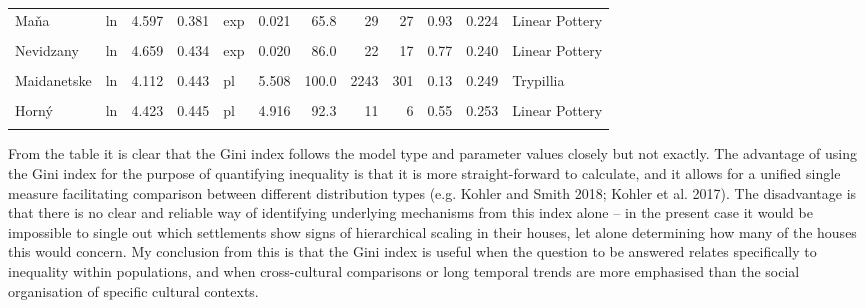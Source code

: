 \documentclass[
  12pt,
  a4paper, twoside]{book}
\begin{document}
\begin{landscape}
\begin{table}
\begin{tabular}[t]{llrrlrrrrrrl}
\addlinespace
Maňa & ln & 4.597 & 0.381 & exp & 0.021 & 65.8 & 29 & 27 & 0.93 & 0.224 & Linear Pottery\\
\cellcolor{gray!6}{Čierne} & \cellcolor{gray!6}{ln} & \cellcolor{gray!6}{4.703} & \cellcolor{gray!6}{0.376} & \cellcolor{gray!6}{exp} & \cellcolor{gray!6}{0.021} & \cellcolor{gray!6}{89.2} & \cellcolor{gray!6}{49} & \cellcolor{gray!6}{36} & \cellcolor{gray!6}{0.73} & \cellcolor{gray!6}{0.211} & \cellcolor{gray!6}{Linear Pottery}\\
Nevidzany & ln & 4.659 & 0.434 & exp & 0.020 & 86.0 & 22 & 17 & 0.77 & 0.240 & Linear Pottery\\
\cellcolor{gray!6}{Moshuriv} & \cellcolor{gray!6}{ln} & \cellcolor{gray!6}{4.211} & \cellcolor{gray!6}{0.395} & \cellcolor{gray!6}{pl} & \cellcolor{gray!6}{6.306} & \cellcolor{gray!6}{85.3} & \cellcolor{gray!6}{84} & \cellcolor{gray!6}{29} & \cellcolor{gray!6}{0.35} & \cellcolor{gray!6}{0.219} & \cellcolor{gray!6}{Trypillia}\\
Maidanetske & ln & 4.112 & 0.443 & pl & 5.508 & 100.0 & 2243 & 301 & 0.13 & 0.249 & Trypillia\\
\addlinespace
\cellcolor{gray!6}{Vráble 'VL'} & \cellcolor{gray!6}{ln} & \cellcolor{gray!6}{4.198} & \cellcolor{gray!6}{0.389} & \cellcolor{gray!6}{pl} & \cellcolor{gray!6}{5.235} & \cellcolor{gray!6}{83.6} & \cellcolor{gray!6}{313} & \cellcolor{gray!6}{91} & \cellcolor{gray!6}{0.29} & \cellcolor{gray!6}{0.221} & \cellcolor{gray!6}{Linear Pottery}\\
Horný & ln & 4.423 & 0.445 & pl & 4.916 & 92.3 & 11 & 6 & 0.55 & 0.253 & Linear Pottery\\
\cellcolor{gray!6}{Nebelivka} & \cellcolor{gray!6}{ln} & \cellcolor{gray!6}{4.045} & \cellcolor{gray!6}{0.432} & \cellcolor{gray!6}{pl} & \cellcolor{gray!6}{4.764} & \cellcolor{gray!6}{62.6} & \cellcolor{gray!6}{1435} & \cellcolor{gray!6}{629} & \cellcolor{gray!6}{0.44} & \cellcolor{gray!6}{0.239} & \cellcolor{gray!6}{Trypillia}\\
\bottomrule
\end{tabular}
\end{table}
\end{landscape}

From the table it is clear that the Gini index follows the model type and parameter values closely but not exactly. The advantage of using the Gini index for the purpose of quantifying inequality is that it is more straight-forward to calculate, and it allows for a unified single measure facilitating comparison between different distribution types (e.g. Kohler and Smith 2018; Kohler et al. 2017). The disadvantage is that there is no clear and reliable way of identifying underlying mechanisms from this index alone -- in the present case it would be impossible to single out which settlements show signs of hierarchical scaling in their houses, let alone determining how many of the houses this would concern. My conclusion from this is that the Gini index is useful when the question to be answered relates specifically to inequality within populations, and when cross-cultural comparisons or long temporal trends are more emphasised than the social organisation of specific cultural contexts.
\end{document}
